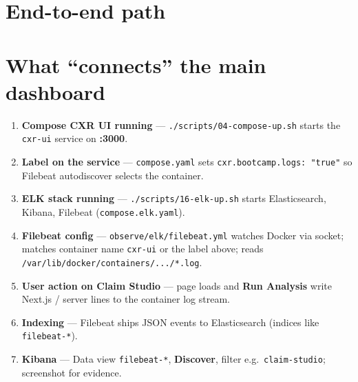 \documentclass[11pt,a4paper]{report}
\begin{document}
\section{End-to-end path}

\begin{center}
\end{center}

\section{What ``connects'' the main dashboard}

\begin{enumerate}
  \item \textbf{Compose CXR UI running} --- \texttt{./scripts/04-compose-up.sh} starts the \texttt{cxr-ui} service on \textbf{:3000}.
  \item \textbf{Label on the service} --- \texttt{compose.yaml} sets \texttt{cxr.bootcamp.logs: "true"} so Filebeat autodiscover selects the container.
  \item \textbf{ELK stack running} --- \texttt{./scripts/16-elk-up.sh} starts Elasticsearch, Kibana, Filebeat (\texttt{compose.elk.yaml}).
  \item \textbf{Filebeat config} --- \texttt{observe/elk/filebeat.yml} watches Docker via socket; matches container name \texttt{cxr-ui} or the label above; reads \texttt{/var/lib/docker/containers/.../*.log}.
  \item \textbf{User action on Claim Studio} --- page loads and \textbf{Run Analysis} write Next.js / server lines to the container log stream.
  \item \textbf{Indexing} --- Filebeat ships JSON events to Elasticsearch (indices like \texttt{filebeat-*}).
  \item \textbf{Kibana} --- Data view \texttt{filebeat-*}, \textbf{Discover}, filter e.g.\ \texttt{claim-studio}; screenshot for evidence.
\end{enumerate}
\end{document}
